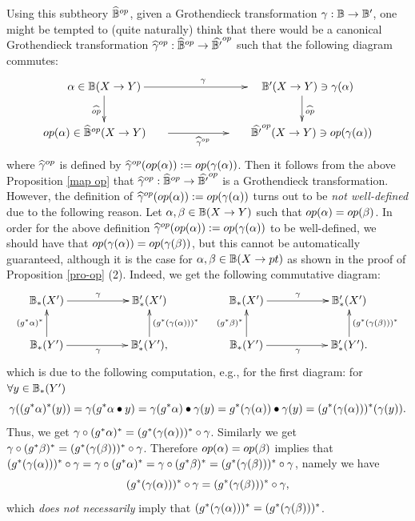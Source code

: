 \documentclass[a4paper]{amsart}
\begin{document}
Using this subtheory $\widehat{\mathbb B}^{op}$, given a Grothendieck transformation $\gamma: \mathbb B \to \mathbb B'$, one might be tempted to (quite naturally) think that there would be a canonical Grothendieck transformation $\widehat{\gamma}^{op}: \widehat{\mathbb B}^{op} \to \widehat{\mathbb B'}^{op}$ such that the following diagram commutes:
\[
\xymatrix
{
\alp \in \bB (X \to Y)  \ar[rr]^{\ga} \ar[d]_{\widehat{op}} && \quad \bB' (X \to Y) \ni \ga(\alp) \ar[d]^{\widehat{op}} \\
op(\alp) \in \widehat{\bB}^{op}  (X \to Y) \hspace{0.6cm} \ar[rr]_{\widehat{\ga}^{op}} && \hspace{0.6cm} \widehat{\bB'}^{op} (X \to Y) \ni op(\ga(\alp))
}
\]
where $\widehat{\gamma}^{op}$ is 
defined by $\widehat{\gamma}^{op} (op(\alpha)):=op(\gamma(\alpha))$. Then it follows from the above Proposition \ref{map op} that 
$\widehat{\gamma}^{op}: \widehat{\mathbb B}^{op} \to \widehat{\mathbb B'}^{op}$ is a Grothendieck transformation. However, the definition of $\widehat{\gamma}^{op} (op(\alpha)):=op(\gamma(\alpha))$ turns out to be \emph{not well-defined} due to the following reason. 
Let $\alpha, \beta \in \mathbb B(X \to Y)$ such that $op(\alpha)=op(\beta)$. In order for the above definition $\widehat{\gamma}^{op} (op(\alpha)):=op(\gamma(\alpha))$ to be well-defined, we should have that $op(\gamma(\alpha))=op(\gamma(\beta))$, but this cannot be automatically guaranteed, although it is the case for $\alpha, \beta \in  \mathbb B(X \to pt)$ as shown in the proof of Proposition \ref{pro-op} (2). 
Indeed, we get the following commutative diagram:
\[
\xymatrix
{
\bB_*(X') \ar[rr]^{\ga} && \bB'_*(X') \\
\bB_*(Y') \ar[u]^{(g^*\alp)^*} \ar[rr]_{\ga} && \bB'_*(Y'), \ar[u]_{(g^*(\ga(\alp)))^*} 
}
\quad 
\xymatrix
{
\bB_*(X') \ar[rr]^{\ga} && \bB'_*(X') \\
\bB_*(Y') \ar[u]^{(g^*\be)^*} \ar[rr]_{\ga} && \bB'_*(Y'). \ar[u]_{(g^*(\ga(\be)))^*} 
}
\]
which is due to the following computation, e.g., for the first diagram: for $\forall y \in \mathbb B_*(Y')$ 
$$\gamma((g^*\alpha)^*(y)) = \gamma(g^*\alpha \bullet y) = \gamma(g^*\alpha) \bullet \gamma(y) = g^*(\gamma(\alpha))\bullet \gamma(y) = (g^*(\gamma(\alpha)))^*(\gamma(y)).$$
Thus, we get $\gamma  \circ (g^*\alpha)^* = (g^*(\gamma(\alpha)))^* \circ \gamma$. Similarly we get $\gamma  \circ (g^*\beta)^* = (g^*(\gamma(\beta)))^* \circ \gamma$. Therefore $op(\alpha) =op(\beta)$ implies that $(g^*(\gamma(\alpha)))^* \circ \gamma = \gamma  \circ (g^*\alpha)^* = \gamma  \circ (g^*\beta)^* = (g^*(\gamma(\beta)))^* \circ \gamma$, namely we have
$$(g^*(\gamma(\alpha)))^* \circ \gamma = (g^*(\gamma(\beta)))^* \circ \gamma, $$
which \emph{does not necessarily} imply that $(g^*(\gamma(\alpha)))^* = (g^*(\gamma(\beta)))^*$. 
\end{document}
